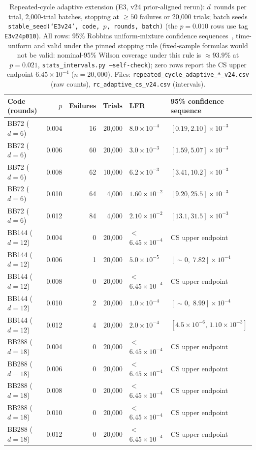 \documentclass[11pt,a4paper]{article}
\begin{document}
\begin{table}[H]\centering\small
\caption{Repeated-cycle adaptive extension (E3, v24 prior-aligned
  rerun): $d$~rounds per trial, 2{,}000-trial batches, stopping at
  $\ge50$ failures or 20{,}000 trials; batch seeds
  \texttt{stable\_seed(`E3v24',\,code,\,$p$,\,rounds,\,batch)} (the
  $p=0.010$ rows use tag \texttt{E3v24p010}). All rows: 95\% Robbins
  uniform-mixture confidence sequences~\cite{howard2021confidence},
  time-uniform and valid under the pinned stopping rule (fixed-sample
  formulas would not be valid: nominal-95\% Wilson coverage under this
  rule is $\approx\!93.9\%$ at $p=0.021$,
  \texttt{stats\_intervals.py --self-check}); zero rows report the CS
  upper endpoint $6.45\times10^{-4}$ ($n=20{,}000$).
  Files: \texttt{repeated\_cycle\_adaptive\_*\_v24.csv} (raw counts),
  \texttt{rc\_adaptive\_cs\_v24.csv} (intervals).}\label{tab:rc_adaptive}
\begin{tabular}{@{}lrrrll@{}}
\toprule
Code (rounds) & $p$ & Failures & Trials & LFR & 95\% confidence sequence \\\midrule
BB72 ($d=6$)   & 0.004 & 16 & 20{,}000 & $8.0\times10^{-4}$ & $[0.19,2.10]\times10^{-3}$ \\
BB72 ($d=6$)   & 0.006 & 60 & 20{,}000 & $3.0\times10^{-3}$ & $[1.59,5.07]\times10^{-3}$ \\
BB72 ($d=6$)   & 0.008 & 62 & 10{,}000 & $6.2\times10^{-3}$ & $[3.41,10.2]\times10^{-3}$ \\
BB72 ($d=6$)   & 0.010 & 64 & 4{,}000  & $1.60\times10^{-2}$ & $[9.20,25.5]\times10^{-3}$ \\
BB72 ($d=6$)   & 0.012 & 84 & 4{,}000  & $2.10\times10^{-2}$ & $[13.1,31.5]\times10^{-3}$ \\\midrule
BB144 ($d=12$) & 0.004 & 0 & 20{,}000 & $<$$6.45\times10^{-4}$ & CS upper endpoint \\
BB144 ($d=12$) & 0.006 & 1 & 20{,}000 & $5.0\times10^{-5}$ & $[{\sim}0,\;7.82]\times10^{-4}$ \\
BB144 ($d=12$) & 0.008 & 0 & 20{,}000 & $<$$6.45\times10^{-4}$ & CS upper endpoint \\
BB144 ($d=12$) & 0.010 & 2 & 20{,}000 & $1.0\times10^{-4}$ & $[{\sim}0,\;8.99]\times10^{-4}$ \\
BB144 ($d=12$) & 0.012 & 4 & 20{,}000 & $2.0\times10^{-4}$ & $[4.5\times10^{-6},\,1.10\times10^{-3}]$ \\\midrule
BB288 ($d=18$) & 0.004 & 0 & 20{,}000 & $<$$6.45\times10^{-4}$ & CS upper endpoint \\
BB288 ($d=18$) & 0.006 & 0 & 20{,}000 & $<$$6.45\times10^{-4}$ & CS upper endpoint \\
BB288 ($d=18$) & 0.008 & 0 & 20{,}000 & $<$$6.45\times10^{-4}$ & CS upper endpoint \\
BB288 ($d=18$) & 0.010 & 0 & 20{,}000 & $<$$6.45\times10^{-4}$ & CS upper endpoint \\
BB288 ($d=18$) & 0.012 & 0 & 20{,}000 & $<$$6.45\times10^{-4}$ & CS upper endpoint \\
\bottomrule
\end{tabular}
\end{table}
\end{document}
